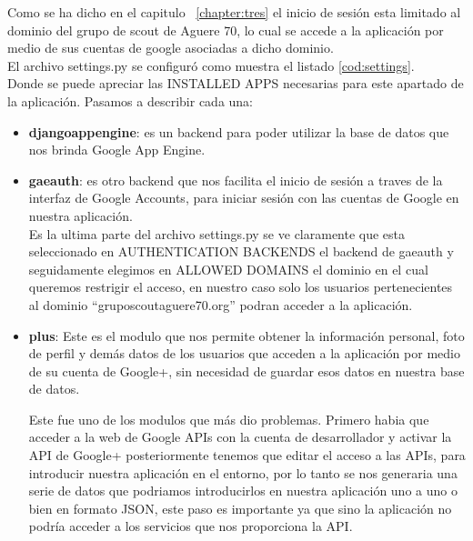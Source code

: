 Como se ha dicho en el capitulo ~\ref{chapter:tres} el inicio de sesión esta limitado al dominio del grupo de scout de Aguere 70, lo cual se accede a la aplicación
por medio de sus cuentas de google asociadas a dicho dominio.\\

El archivo settings.py se configuró como muestra el listado \ref{cod:settings}.\\



Donde se puede apreciar las \textsc{INSTALLED APPS} necesarias para este apartado de la aplicación. Pasamos a describir cada una:\\
\begin{itemize}
\item \textbf{djangoappengine}: es un backend para poder utilizar la base de datos que nos brinda Google App Engine.\\

\item \textbf{gaeauth}: es otro backend que nos facilita el inicio de sesión a traves de la interfaz de Google Accounts, 
para iniciar sesión con las cuentas de Google en nuestra aplicación.\\

Es la ultima parte del archivo settings.py se ve claramente que esta seleccionado en \textsc{AUTHENTICATION BACKENDS} el backend de gaeauth y seguidamente elegimos en \textsc{ALLOWED DOMAINS} el dominio
en el cual queremos restrigir el acceso, en nuestro caso solo los usuarios pertenecientes al dominio ``gruposcoutaguere70.org'' podran acceder a la aplicación.

\item \textbf{plus}: Este es el modulo que nos permite obtener la información personal, foto de perfil y demás datos de los usuarios que acceden a la aplicación por medio de su cuenta de Google+, sin necesidad
de guardar esos datos en nuestra base de datos.

Este fue uno de los modulos que más dio problemas. Primero habia que acceder a la web de Google APIs con la cuenta de desarrollador y activar la API de Google+ posteriormente tenemos que editar el acceso a las APIs,
para introducir nuestra aplicación en el entorno, por lo tanto se nos generaria una serie de datos que podriamos introducirlos en nuestra aplicación uno a uno o bien en formato JSON, este paso es importante ya que sino la aplicación
no podría acceder a los servicios que nos proporciona la API.\\

\end{itemize}

